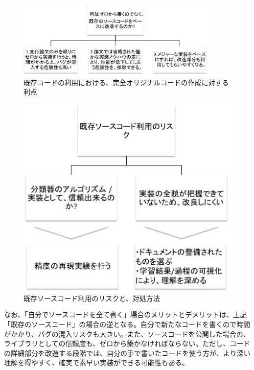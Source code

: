 \begin{figure}[tbp]
 \begin{center}
  \includegraphics[width=100mm]{img/c4/library_merit}
 \end{center}
 \caption{既存コードの利用における、完全オリジナルコードの作成に対する利点}
 \label{c4_library_merit}
\end{figure}

\begin{figure}[tbp]
 \begin{center}
  \includegraphics[width=120mm]{img/c4/library_hedge}
 \end{center}
 \caption{既存ソースコード利用のリスクと、対処方法}
 \label{c4_library_hedge}
\end{figure}

なお、「自分でソースコードを全て書く」場合のメリットとデメリットは、上記「既存のソースコード」の場合の逆となる。自分で新たなコードを書くので時間がかかり、バグの混入リスクも大きい。また、ソースコードを公開した場合の、ライブラリとしての信頼度も、ゼロから築かなければならない。ただし、コードの詳細部分を改造する段階では、自分の手で書いたコードを使う方が、より深い理解を得やすく、確実で素早い実装ができる可能性もある。\par

